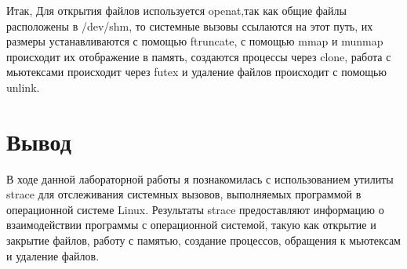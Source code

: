 \documentclass[a4paper, 14pt]{article}
\begin{document}
Итак, Для открытия файлов используется openat,так как общие файлы расположены в /dev/shm, то системные вызовы ссылаются на этот путь, их размеры устанавливаются  с помощью ftruncate, с помощью mmap и munmap происходит их отображение в память, создаются процессы через clone, работа с мьютексами происходит через futex и удаление файлов происходит с помощью unlink.

\section*{Вывод}

В ходе данной лабораторной работы я познакомилась с использованием утилиты strace для отслеживания системных вызовов, выполняемых программой в операционной системе Linux. Результаты strace предоставляют информацию о взаимодействии программы с операционной системой, такую как открытие и закрытие файлов, работу с памятью, создание процессов, обращения к мьютексам и удаление файлов. 
\end{document}
